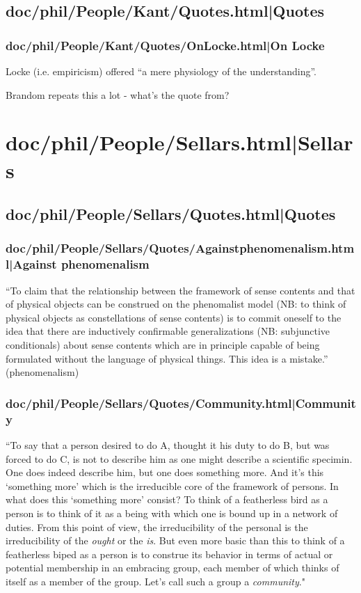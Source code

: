 \documentclass[12pt,a4paper]{report}
\begin{document}
\subsection{doc/phil/People/Kant/Quotes.html|Quotes}

\subsubsection{doc/phil/People/Kant/Quotes/OnLocke.html|On Locke}
Locke (i.e. empiricism) offered ``a mere physiology of the understanding''.

Brandom repeats this a lot - what's the quote from?
\section{doc/phil/People/Sellars.html|Sellars}

\subsection{doc/phil/People/Sellars/Quotes.html|Quotes}

\subsubsection{doc/phil/People/Sellars/Quotes/Againstphenomenalism.html|Against phenomenalism}
``To claim that the relationship between the framework of sense contents and
that of physical objects can be construed on the phenomalist model (NB: to
think of physical objects as constellations of sense contents) is to commit
oneself to the idea that there are inductively confirmable generalizations (NB:
 subjunctive conditionals) about sense contents which are in principle capable
 of being formulated without the language of physical things. This idea is a
 mistake.'' (phenomenalism)

\subsubsection{doc/phil/People/Sellars/Quotes/Community.html|Community}
``To say that a person desired to do A, thought it his duty to do B, but was forced to do C, is not to describe him as one might describe a scientific specimin. One does indeed describe him, but one does something more. And it's this `something more' which is the irreducible core of the framework of persons. In what does this `something more' consist? To think of a featherless bird as a person is to think of it as a being with which  one is bound up in a network of duties. From this point of view, the irreducibility of the personal is the irreducibility of the \emph{ought} or the \emph{is}. But even more basic than this to think of a featherless biped as a person is to construe its behavior in terms of actual or potential membership in an embracing group, each member of which thinks of itself as a member of the group. Let's call such a group a \emph{community}."
\end{document}
